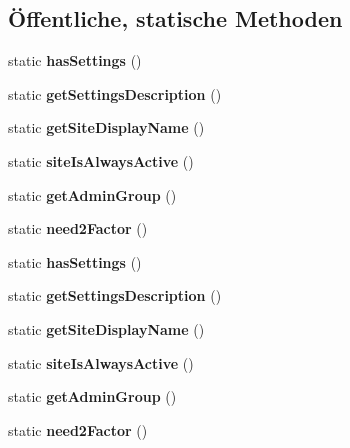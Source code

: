 \subsection*{Öffentliche, statische Methoden}
\begin{DoxyCompactItemize}
\item 
\mbox{\label{class_notenverwaltung_zeugnisse_a976846e53869267ac0597b243909de2d}} 
static {\bfseries has\+Settings} ()
\item 
\mbox{\label{class_notenverwaltung_zeugnisse_a4d14c6783f36274ed3ac1ae6a435df38}} 
static {\bfseries get\+Settings\+Description} ()
\item 
\mbox{\label{class_notenverwaltung_zeugnisse_a9e7be8725c70c35620028319766fcffc}} 
static {\bfseries get\+Site\+Display\+Name} ()
\item 
\mbox{\label{class_notenverwaltung_zeugnisse_a7aeff835475c61c14ee67c3661552448}} 
static {\bfseries site\+Is\+Always\+Active} ()
\item 
\mbox{\label{class_notenverwaltung_zeugnisse_a8577b1c0be719a398fbf052b81b851b3}} 
static {\bfseries get\+Admin\+Group} ()
\item 
\mbox{\label{class_notenverwaltung_zeugnisse_a46a944e24f4daddebc7a39ad2243951e}} 
static {\bfseries need2\+Factor} ()
\item 
\mbox{\label{class_notenverwaltung_zeugnisse_a976846e53869267ac0597b243909de2d}} 
static {\bfseries has\+Settings} ()
\item 
\mbox{\label{class_notenverwaltung_zeugnisse_a4d14c6783f36274ed3ac1ae6a435df38}} 
static {\bfseries get\+Settings\+Description} ()
\item 
\mbox{\label{class_notenverwaltung_zeugnisse_a9e7be8725c70c35620028319766fcffc}} 
static {\bfseries get\+Site\+Display\+Name} ()
\item 
\mbox{\label{class_notenverwaltung_zeugnisse_a7aeff835475c61c14ee67c3661552448}} 
static {\bfseries site\+Is\+Always\+Active} ()
\item 
\mbox{\label{class_notenverwaltung_zeugnisse_a8577b1c0be719a398fbf052b81b851b3}} 
static {\bfseries get\+Admin\+Group} ()
\item 
\mbox{\label{class_notenverwaltung_zeugnisse_a46a944e24f4daddebc7a39ad2243951e}} 
static {\bfseries need2\+Factor} ()
\end{DoxyCompactItemize}
